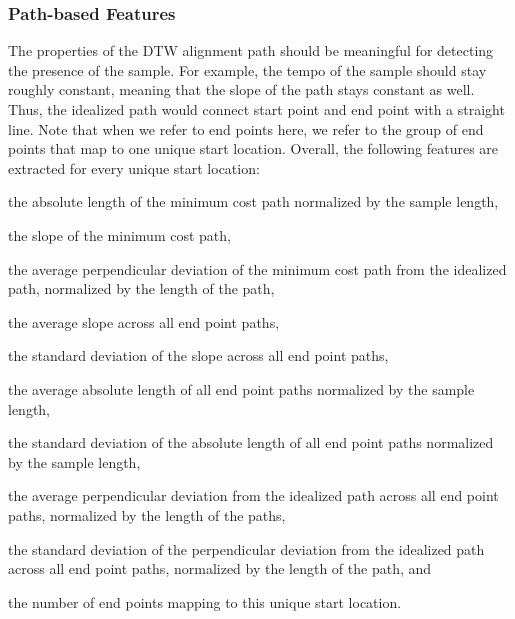 \documentclass{article}
\begin{document}
\subsubsection{Path-based Features}
The properties of the DTW alignment path should be meaningful for detecting the presence of the sample.  For example, the tempo of the sample should stay roughly constant, meaning that the slope of the path stays constant as well. Thus, the idealized path would connect start point and end point with a straight line. Note that when we refer to end points here, we refer to the group of end points that map to one  unique start location.
Overall, the following features are extracted for every unique start location: 
\begin{inparaenum}[(i)]
    \item   the absolute length of the minimum cost path normalized by the sample length,
    \item   the slope of the minimum cost path, 
    \item   the average perpendicular deviation of the minimum cost path from the idealized path, normalized by the length of the path,
    \item   the average slope across all end point paths, 
		\item   the standard deviation of the slope across all end point paths, 
    \item   the average absolute length of all end point paths normalized by the sample length,
		\item   the standard deviation of the absolute length of all end point paths normalized by the sample length,
    \item   the average perpendicular deviation from the idealized path across all end point paths, normalized by the length of the paths,
    \item   the standard deviation of the perpendicular deviation from the idealized path across all end point paths, normalized by the length of the path, and
    \item   the number of end points mapping to this unique start location.
\end{inparaenum}

\end{document}
